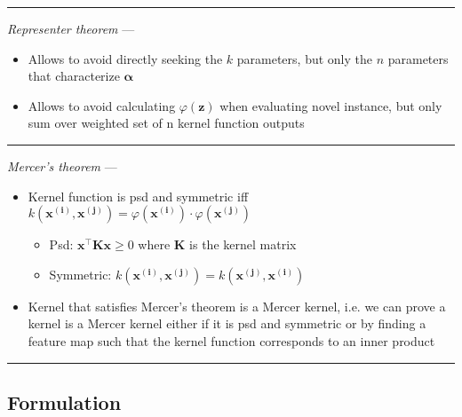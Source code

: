 {\color{lightgray}\hrule height 0.001mm}

\emph{Representer theorem} ---
\begin{itemize}
    \item Allows to avoid directly seeking the $k$ parameters, but only the $n$ parameters that characterize $\boldsymbol{\alpha}$
    \item Allows to avoid calculating $\varphi({\boldsymbol{z}})$ when evaluating novel instance, but only sum over weighted set of n kernel function outputs
\end{itemize}

{\color{lightgray}\hrule height 0.001mm}

\emph{Mercer's theorem} ---
\begin{itemize}
    \item Kernel function is psd and symmetric iff $k(\boldsymbol{x^{(i)}}, \boldsymbol{x^{(j)}}) = \varphi(\boldsymbol{x^{(i)}}) \cdot \varphi(\boldsymbol{x^{(j)}})$
    \begin{itemize}
        \item Psd: $\boldsymbol{x}^\intercal \boldsymbol{K} \boldsymbol{x} \geq 0$ where $\boldsymbol{K}$ is the kernel matrix
        \item Symmetric: $k(\boldsymbol{x^{(i)}}, \boldsymbol{x^{(j)}}) = k(\boldsymbol{x^{(j)}}, \boldsymbol{x^{(i)}})$
    \end{itemize}
    \item Kernel that satisfies Mercer's theorem is a Mercer kernel, i.e. we can prove a kernel is a Mercer kernel either if it is psd and symmetric or by finding a feature map such that the kernel function corresponds to an inner product    
\end{itemize}

{\color{black}\hrule height 0.001mm}

\subsection*{Formulation}

